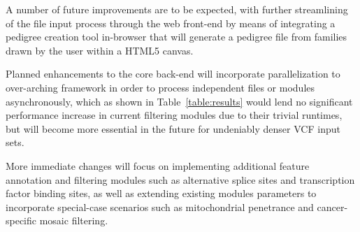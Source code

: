 A number of future improvements are to be expected, with further streamlining of the file input process through the web front-end by means of integrating a pedigree creation tool in-browser that will generate a pedigree file from families drawn by the user within a HTML5 canvas.

Planned enhancements to the core \app back-end will incorporate parallelization to over-arching framework in order to process independent files or modules asynchronously, which as shown in Table~\ref{table:results} would lend no significant performance increase in current filtering modules due to their trivial runtimes, but will become more essential in the future for undeniably denser VCF input sets.

More immediate changes will focus on implementing additional feature annotation and filtering modules such as alternative splice sites and transcription factor binding sites, as well as extending existing modules parameters to incorporate special-case scenarios such as mitochondrial penetrance and cancer-specific mosaic filtering.

